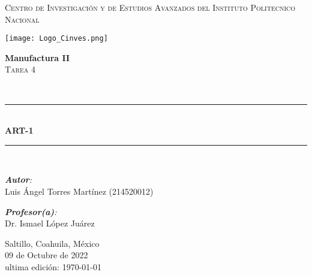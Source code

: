 \begin{center}
    \newcommand{\HRule}{\rule{\linewidth}{0.5mm}}
    \vspace*{0.5cm}

    \begin{spacing}{1.5}
        \textsc{\huge Centro de Investigación y de Estudios Avanzados del Instituto Politecnico Nacional}\\[0.15cm]
    \end{spacing}

    \begin{center}
        \texttt{[image: Logo\_Cinves.png]}
    \end{center}

    \begin{minipage}{0.9\textwidth}
        \begin{center}
            \textbf{\Large Manufactura II}\\
            \vspace*{0.5cm}
            \textsc{\LARGE Tarea 4 }
        \end{center}
    \end{minipage}\\[0.1cm]

 	\vspace*{1cm}

    \HRule \\[0.4cm]{\huge \bfseries ART-1}\\[0.4cm] %
    \HRule \\[1.5cm]

    \begin{minipage}{\textwidth}
        \begin{flushleft} \large
            \emph{\textbf{Autor}:}\\
            Luis Ángel Torres Martínez  (214520012)
        \end{flushleft}
    \end{minipage}

    \begin{minipage}{\textwidth}
        \vspace{-1cm}
        \begin{flushright} \large
            \emph{\textbf{Profesor(a)}:} \\
            Dr. Ismael López Juárez \\
        \end{flushright}
    \end{minipage}

    \vspace{3cm}
    
    Saltillo, Coahuila, México \\ %
    09 de Octubre de 2022\\ %
    ultima edición: {\today} %
\end{center}